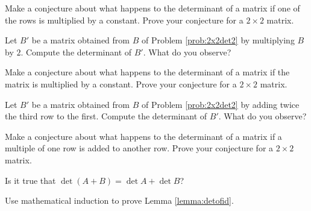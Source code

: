 \documentclass{ximera}
\begin{document}
\begin{problem}\label{prob:rowtimesconstant2x2proof}
Make a conjecture about what happens to the determinant of a matrix if one of the rows is multiplied by a constant.  Prove your conjecture for a $2\times 2$ matrix.
\end{problem}

\begin{problem}\label{prob:matrixtimesconst}
Let $B'$ be a matrix obtained from $B$ of Problem \ref{prob:2x2det2} by multiplying $B$ by $2$.  Compute the determinant of $B'$.  What do you observe?
\end{problem}

\begin{problem}\label{prob:matrixtimesconstant2x2proof}
Make a conjecture about what happens to the determinant of a matrix if the matrix is multiplied by a constant.  Prove your conjecture for a $2\times 2$ matrix.
\end{problem}

\begin{problem}\label{prob:scalarmultofrow}
Let $B'$ be a matrix obtained from $B$ of Problem \ref{prob:2x2det2} by adding twice the third row to the first.  Compute the determinant of $B'$.  What do you observe?
\end{problem}

\begin{problem}\label{prob:scalarmultofrow2x2}
Make a conjecture about what happens to the determinant of a matrix if a multiple of one row is added to another row.  Prove your conjecture for a $2\times 2$ matrix.
\end{problem}

\begin{problem}\label{prob:detsumsumdetquestion}
Is it true that 
$\det{(A+B)}=\det{A}+\det{B}$?
\end{problem}

\begin{problem}\label{prob:detIproof}
Use mathematical induction to prove Lemma \ref{lemma:detofid}.
\end{problem}
\end{document}
